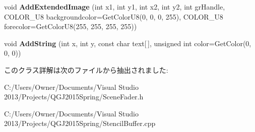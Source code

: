 \begin{DoxyCompactItemize}
\item 
void {\bfseries Add\+Extended\+Image} (int x1, int y1, int x2, int y2, int gr\+Handle, C\+O\+L\+O\+R\+\_\+\+U8 backgroundcolor=Get\+Color\+U8(0, 0, 0, 255), C\+O\+L\+O\+R\+\_\+\+U8 forecolor=Get\+Color\+U8(255, 255, 255, 255))\hypertarget{class_stencil_buffer_aecb6e2f6e4d917d723174ef8ea0d7fa4}{}\label{class_stencil_buffer_aecb6e2f6e4d917d723174ef8ea0d7fa4}

\item 
void {\bfseries Add\+String} (int x, int y, const char text\mbox{[}$\,$\mbox{]}, unsigned int color=Get\+Color(0, 0, 0))\hypertarget{class_stencil_buffer_ae9a0575108009364e110c7bc6a0fb3a0}{}\label{class_stencil_buffer_ae9a0575108009364e110c7bc6a0fb3a0}

\end{DoxyCompactItemize}


このクラス詳解は次のファイルから抽出されました\+:\begin{DoxyCompactItemize}
\item 
C\+:/\+Users/\+Owner/\+Documents/\+Visual Studio 2013/\+Projects/\+Q\+G\+J2015\+Spring/Scene\+Fader.\+h\item 
C\+:/\+Users/\+Owner/\+Documents/\+Visual Studio 2013/\+Projects/\+Q\+G\+J2015\+Spring/Stencil\+Buffer.\+cpp\end{DoxyCompactItemize}
